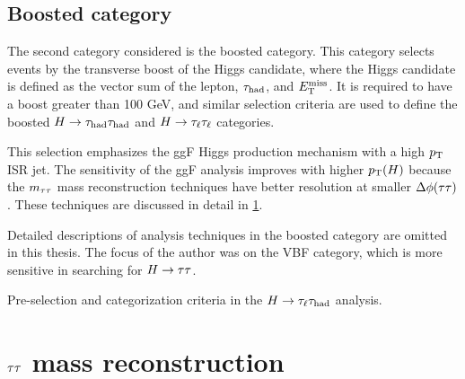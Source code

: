\subsection{Boosted category}
\label{sec:strategy-boost}

The second category considered is the boosted category. This category selects events by the transverse boost of the Higgs candidate, where the Higgs candidate is defined as the vector sum of the lepton, $\tau_\text{had}$, and $E_{\mathrm{T}}^{\mathrm{miss}}$. It is required to have a boost greater than 100 GeV, and similar selection criteria are used to define the boosted $H\rightarrow\tau_\text{had}\tau_\text{had}$ and $H\rightarrow\tau_\ell\tau_\ell$ categories.

This selection emphasizes the ggF Higgs production mechanism with a high $p_{\mathrm{T}}$ ISR jet. The sensitivity of the ggF analysis improves with higher $p_{\mathrm{T}}(H)$ because the $m_{\tau\tau}$ mass reconstruction techniques have better resolution at smaller $\Delta\phi(\tau\tau)$. These techniques are discussed in detail in \cref{sec:strategy-mtautau}.

Detailed descriptions of analysis techniques in the boosted category are omitted in this thesis. The focus of the author was on the VBF category, which is more sensitive in searching for $H\rightarrow\tau\tau$.

\begin{table}[bp]
  \centering
  \renewcommand{\arraystretch}{1.4}
  \caption{Pre-selection and categorization criteria in the $H\rightarrow\tau_\ell\tau_\text{had}$ analysis.}
  
  \label{tab:strategy-selection}
\end{table}

\clearpage

\section{$\tau\tau$ mass reconstruction}
\label{sec:strategy-mtautau}

